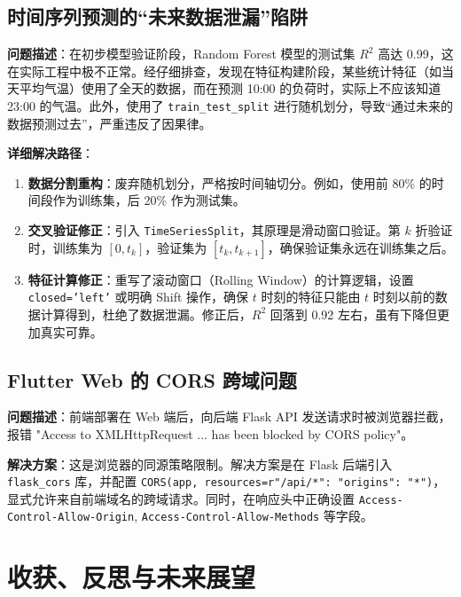 \subsection{时间序列预测的“未来数据泄漏”陷阱}
\textbf{问题描述}：在初步模型验证阶段，Random Forest 模型的测试集 $R^2$ 高达 0.99，这在实际工程中极不正常。经仔细排查，发现在特征构建阶段，某些统计特征（如当天平均气温）使用了全天的数据，而在预测 10:00 的负荷时，实际上不应该知道 23:00 的气温。此外，使用了 \texttt{train\_test\_split} 进行随机划分，导致“通过未来的数据预测过去”，严重违反了因果律。

\textbf{详细解决路径}：
\begin{enumerate}
    \item \textbf{数据分割重构}：废弃随机划分，严格按时间轴切分。例如，使用前 80\% 的时间段作为训练集，后 20\% 作为测试集。
    \item \textbf{交叉验证修正}：引入 \texttt{TimeSeriesSplit}，其原理是滑动窗口验证。第 $k$ 折验证时，训练集为 $[0, t_k]$，验证集为 $[t_k, t_{k+1}]$，确保验证集永远在训练集之后。
    \item \textbf{特征计算修正}：重写了滚动窗口（Rolling Window）的计算逻辑，设置 \texttt{closed='left'} 或明确 Shift 操作，确保 $t$ 时刻的特征只能由 $t$ 时刻以前的数据计算得到，杜绝了数据泄漏。修正后，$R^2$ 回落到 0.92 左右，虽有下降但更加真实可靠。
\end{enumerate}

\subsection{Flutter Web 的 CORS 跨域问题}
\textbf{问题描述}：前端部署在 Web 端后，向后端 Flask API 发送请求时被浏览器拦截，报错 "Access to XMLHttpRequest ... has been blocked by CORS policy"。

\textbf{解决方案}：这是浏览器的同源策略限制。解决方案是在 Flask 后端引入 \texttt{flask\_cors} 库，并配置 \texttt{CORS(app, resources={r"/api/*": {"origins": "*"}})}，显式允许来自前端域名的跨域请求。同时，在响应头中正确设置 \texttt{Access-Control-Allow-Origin}, \texttt{Access-Control-Allow-Methods} 等字段。

\section{收获、反思与未来展望}

